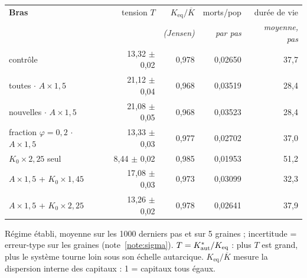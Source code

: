 \begin{center}\footnotesize
\begin{tabular}{@{}lrrrr@{}}
\toprule
\textbf{Bras} & tension $T$ & $K_{\text{eq}}/\overline{K}$ & morts/pop & durée de vie \\
 & & \emph{(Jensen)} & \emph{par pas} & \emph{moyenne, pas} \\
\midrule
contrôle & 13{,}32 $\pm$ 0{,}02 & 0{,}978 & 0{,}02650 & 37{,}7 \\
toutes $\cdot$ $A\times1{,}5$ & 21{,}12 $\pm$ 0{,}04 & 0{,}968 & 0{,}03519 & 28{,}4 \\
nouvelles $\cdot$ $A\times1{,}5$ & 21{,}08 $\pm$ 0{,}05 & 0{,}968 & 0{,}03523 & 28{,}4 \\
fraction $\varphi=0{,}2$ $\cdot$ $A\times1{,}5$ & 13{,}33 $\pm$ 0{,}03 & 0{,}977 & 0{,}02702 & 37{,}0 \\
$K_0\times2{,}25$ seul & 8{,}44 $\pm$ 0{,}02 & 0{,}985 & 0{,}01953 & 51{,}2 \\
$A\times1{,}5$ + $K_0\times1{,}45$ & 17{,}08 $\pm$ 0{,}03 & 0{,}973 & 0{,}03099 & 32{,}3 \\
$A\times1{,}5$ + $K_0\times2{,}25$ & 13{,}26 $\pm$ 0{,}02 & 0{,}978 & 0{,}02641 & 37{,}9 \\
\bottomrule
\end{tabular}
\end{center}

\noindent\footnotesize Régime établi, moyenne sur les 1000 derniers pas et sur 5 graines ; incertitude = erreur-type sur les graines (note~\ref{note:sigma}). $T = K^{*}_{\mathrm{aut}}/K_{\text{eq}}$ : plus $T$ est grand, plus le système tourne loin sous son échelle autarcique. $K_{\text{eq}}/\overline{K}$ mesure la dispersion interne des capitaux : 1 = capitaux tous égaux.\normalsize
